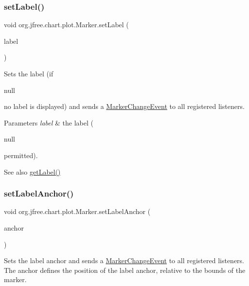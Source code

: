 \subsubsection{\texorpdfstring{set\+Label()}{setLabel()}}
{\footnotesize\ttfamily void org.\+jfree.\+chart.\+plot.\+Marker.\+set\+Label (\begin{DoxyParamCaption}\item[{String}]{label }\end{DoxyParamCaption})}

Sets the label (if
\begin{DoxyCode}
null 
\end{DoxyCode}
 no label is displayed) and sends a \mbox{\hyperlink{}{Marker\+Change\+Event}} to all registered listeners.


\begin{DoxyParams}{Parameters}
{\em label} & the label (
\begin{DoxyCode}
null 
\end{DoxyCode}
 permitted).\\
\hline
\end{DoxyParams}
\begin{DoxySeeAlso}{See also}
\mbox{\hyperlink{classorg_1_1jfree_1_1chart_1_1plot_1_1_marker_ade0e1e05ae18b887d6a4f3f50fdbdf74}{get\+Label()}} 
\end{DoxySeeAlso}
\mbox{\label{classorg_1_1jfree_1_1chart_1_1plot_1_1_marker_a999115c5675ccdc061311b8f9906c0ac}} 
\subsubsection{\texorpdfstring{set\+Label\+Anchor()}{setLabelAnchor()}}
{\footnotesize\ttfamily void org.\+jfree.\+chart.\+plot.\+Marker.\+set\+Label\+Anchor (\begin{DoxyParamCaption}\item[{Rectangle\+Anchor}]{anchor }\end{DoxyParamCaption})}

Sets the label anchor and sends a \mbox{\hyperlink{}{Marker\+Change\+Event}} to all registered listeners. The anchor defines the position of the label anchor, relative to the bounds of the marker.



